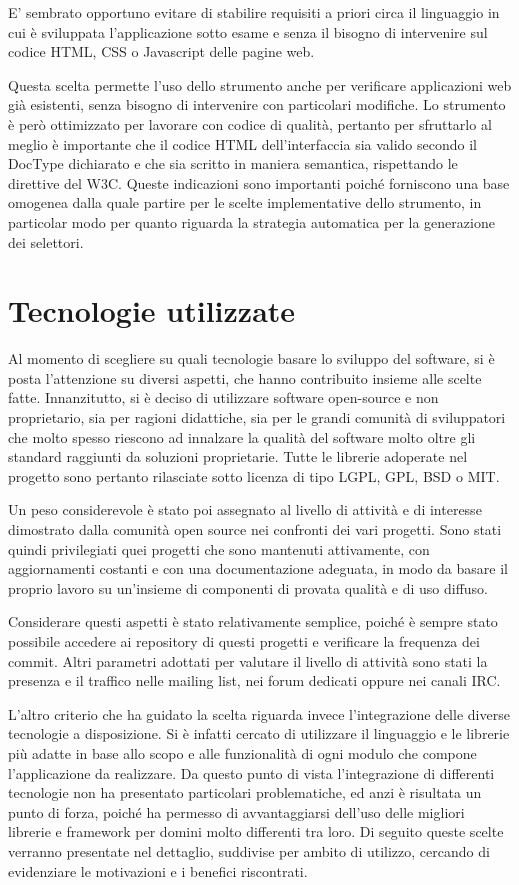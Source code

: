 E' sembrato opportuno evitare di stabilire requisiti a priori circa il linguaggio in cui è sviluppata l'applicazione sotto esame e senza il bisogno di intervenire sul codice HTML, CSS o Javascript delle pagine web. 

Questa scelta permette l'uso dello strumento anche per verificare applicazioni web già esistenti, senza bisogno di intervenire con particolari modifiche. Lo strumento è però ottimizzato per lavorare con codice di qualità, pertanto per sfruttarlo al meglio è importante che il codice HTML dell'interfaccia sia valido secondo il DocType dichiarato e che sia scritto in maniera semantica, rispettando le direttive del W3C. Queste indicazioni sono importanti poiché forniscono una base omogenea dalla quale partire per le scelte implementative dello strumento, in particolar modo per quanto riguarda la strategia automatica per la generazione dei selettori.

\section{Tecnologie utilizzate}

Al momento di scegliere su quali tecnologie basare lo sviluppo del software, si è posta l'attenzione su diversi aspetti, che hanno contribuito insieme alle scelte fatte. Innanzitutto, si è deciso di utilizzare software open-source e non proprietario, sia per ragioni didattiche, sia per le grandi comunità di sviluppatori che molto spesso riescono ad innalzare la qualità del software molto oltre gli standard raggiunti da soluzioni proprietarie. Tutte le librerie adoperate nel progetto sono pertanto rilasciate sotto licenza di tipo LGPL, GPL, BSD o MIT. 

Un peso considerevole è stato poi assegnato al livello di attività e di interesse dimostrato dalla comunità open source nei confronti dei vari progetti. Sono stati quindi privilegiati quei progetti che sono mantenuti attivamente, con aggiornamenti costanti e con una documentazione adeguata, in modo da basare il proprio lavoro su un'insieme di componenti di provata qualità e di uso diffuso. 

Considerare questi aspetti è stato relativamente semplice, poiché è sempre stato possibile accedere ai repository di questi progetti e verificare la frequenza dei commit. Altri parametri adottati per valutare il livello di attività sono stati la presenza e il traffico nelle mailing list, nei forum dedicati oppure nei canali IRC.

L'altro criterio che ha guidato la scelta riguarda invece l'integrazione delle diverse tecnologie a disposizione. Si è infatti cercato di utilizzare il linguaggio e le librerie più adatte in base allo scopo e alle funzionalità di ogni modulo che compone l'applicazione da realizzare. Da questo punto di vista l'integrazione di differenti tecnologie non ha presentato particolari problematiche, ed anzi è risultata un punto di forza, poiché ha permesso di avvantaggiarsi dell'uso delle migliori librerie e framework per domini molto differenti tra loro. Di seguito queste scelte verranno presentate nel dettaglio, suddivise per ambito di utilizzo, cercando di evidenziare le motivazioni e i benefici riscontrati.

